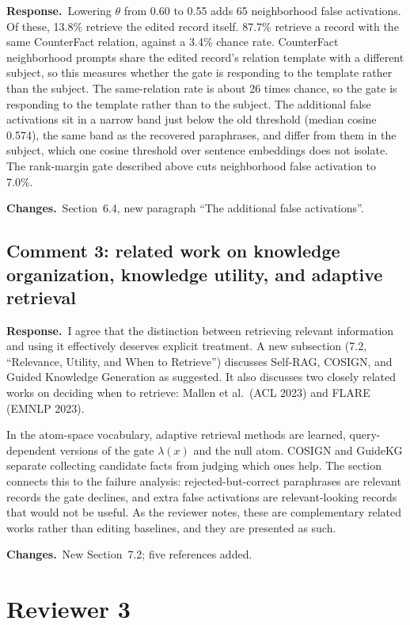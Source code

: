 \documentclass[11pt]{article}
\newcommand{\response}{\par\noindent\textbf{Response.}\ }
\newcommand{\changes}{\par\smallskip\noindent\textbf{Changes.}\ }
\begin{document}
\response Lowering $\theta$ from 0.60 to 0.55 adds 65 neighborhood false activations. Of these, 13.8\% retrieve the edited record itself. 87.7\% retrieve a record with the same CounterFact relation, against a 3.4\% chance rate. CounterFact neighborhood prompts share the edited record's relation template with a different subject, so this measures whether the gate is responding to the template rather than the subject. The same-relation rate is about 26 times chance, so the gate is responding to the template rather than to the subject. The additional false activations sit in a narrow band just below the old threshold (median cosine 0.574), the same band as the recovered paraphrases, and differ from them in the subject, which one cosine threshold over sentence embeddings does not isolate. The rank-margin gate described above cuts neighborhood false activation to 7.0\%.

\changes Section~6.4, new paragraph ``The additional false activations''.

\subsection*{Comment 3: related work on knowledge organization, knowledge utility, and adaptive retrieval}

\response I agree that the distinction between retrieving relevant information and using it effectively deserves explicit treatment. A new subsection (7.2, ``Relevance, Utility, and When to Retrieve'') discusses Self-RAG, COSIGN, and Guided Knowledge Generation as suggested. It also discusses two closely related works on deciding when to retrieve: Mallen et al.\ (ACL 2023) and FLARE (EMNLP 2023).

In the atom-space vocabulary, adaptive retrieval methods are learned, query-dependent versions of the gate $\lambda(x)$ and the null atom. COSIGN and GuideKG separate collecting candidate facts from judging which ones help. The section connects this to the failure analysis: rejected-but-correct paraphrases are relevant records the gate declines, and extra false activations are relevant-looking records that would not be useful. As the reviewer notes, these are complementary related works rather than editing baselines, and they are presented as such.

\changes New Section~7.2; five references added.

\section*{Reviewer 3}
\end{document}

